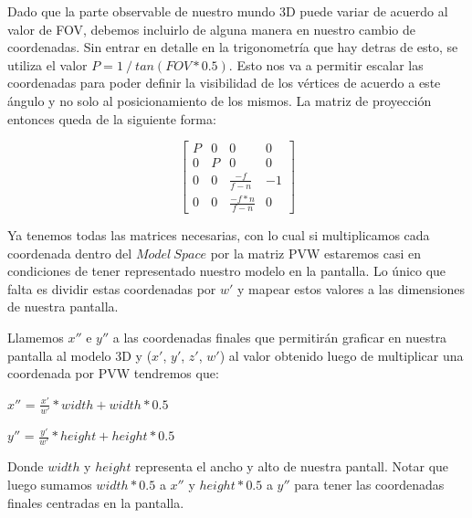 \documentclass[a4paper]{article}
\begin{document}
\pagebreak

Dado que la parte observable de nuestro mundo 3D puede variar de acuerdo al valor de FOV, debemos incluirlo de alguna manera en nuestro cambio de coordenadas. Sin entrar en detalle en la trigonometría que hay detras de esto, se utiliza el valor $P = 1 \ / \ tan(FOV * 0.5)$. Esto nos va a permitir escalar las coordenadas para poder definir la visibilidad de los vértices de acuerdo a este ángulo y no solo al posicionamiento de los mismos.
La matriz de proyección entonces queda de la siguiente forma:


\[
\begin{bmatrix}
P & 0 & 0 & 0 \\
0 & P & 0 & 0 \\
0 & 0 & \frac{-f}{f-n} & -1 \\
0 & 0 & \frac{-f*n}{f-n} & 0  
\end{bmatrix}
\]


Ya tenemos todas las matrices necesarias, con lo cual si multiplicamos cada coordenada dentro del $Model \ Space$ por la matriz PVW estaremos casi en condiciones de tener representado nuestro modelo en la pantalla. Lo único que falta es dividir estas coordenadas por $w'$ y mapear estos valores a las dimensiones de nuestra pantalla.\newline


Llamemos $x''$ e $y''$ a las coordenadas finales que permitirán graficar en nuestra pantalla al modelo 3D y ($x'$, $y'$, $z'$, $w'$) al valor obtenido luego de multiplicar una coordenada por PVW tendremos que: \newline

$x''$ = $\frac{x'}{w'}*width +  width*0.5$ \newline

$y''$ = $\frac{y'}{w'}*height +  height*0.5$ \newline

Donde $width$ y $height$ representa el ancho y alto de nuestra pantall. Notar que luego sumamos $width*0.5$ a $x''$ y $height*0.5$ a $y''$ para tener las coordenadas finales centradas en la pantalla.
\end{document}
